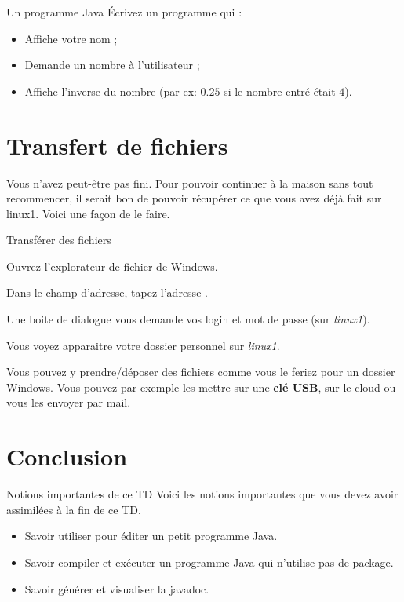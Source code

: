 \documentclass[a4paper,11pt]{style-esi/td}
\begin{document}
	\begin{Exercice}{Un programme Java}
		Écrivez un programme qui :
		\begin{itemize}
		\item Affiche votre nom ;
		\item Demande un nombre à l'utilisateur ;
		\item Affiche l'inverse du nombre (par ex: $0.25$ si le nombre entré était $4$).
		\end{itemize}
	\end{Exercice}

\section{Transfert de fichiers}  

	Vous n'avez peut-être pas fini. Pour pouvoir continuer à la maison sans tout recommencer, 
    il serait bon de pouvoir récupérer ce que vous avez déjà fait sur linux1.
	Voici une façon de le faire.			
				
	\begin{Tutoriel}{Transférer des fichiers}
	\begin{steps}		
		\item 
			Ouvrez l'explorateur de fichier de Windows.
		\item 
			Dans le champ d'adresse, tapez l'adresse .
		\item 
			Une boite de dialogue vous demande vos login et mot de passe (sur \textit{linux1}).
		\item 
			Vous voyez apparaitre votre dossier personnel sur \textit{linux1}. 
		\item 
			Vous pouvez y prendre/déposer des fichiers comme vous le feriez pour un dossier Windows. 
			Vous pouvez par exemple les mettre sur une \textbf{clé USB},
			sur le cloud ou vous les envoyer par mail.
	\end{steps}
	\end{Tutoriel}			

\section{Conclusion}

	\begin{theorie}{Notions importantes de ce TD}
		Voici les notions importantes que vous devez avoir assimilées à la fin de ce TD.
		\begin{itemize}
		\item 
			Savoir utiliser  pour éditer un petit programme Java.
		\item 
			Savoir compiler et exécuter un programme Java 
			qui n'utilise pas de package.
		\item 
			Savoir générer et visualiser la javadoc.
		\end{itemize}
	\end{theorie}


		
\end{document}
